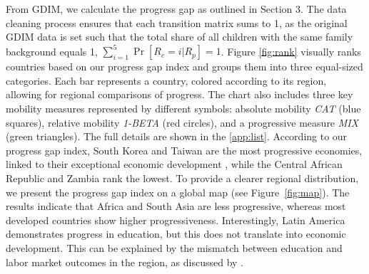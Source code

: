 
From GDIM, we calculate the progress gap as outlined in Section 3. The data cleaning process ensures that each transition matrix sums to 1, as the original GDIM data is set such that the total share of all children with the same family background equals 1, \(\sum_{i=1}^{5} \operatorname{Pr}[R_c = i| R_p] = 1\). Figure \ref{fig:rank} visually ranks countries based on our progress gap index and groups them into three equal-sized categories. Each bar represents a country, colored according to its region, allowing for regional comparisons of progress. The chart also includes three key mobility measures represented by different symbols: absolute mobility \textit{CAT} (blue squares), relative mobility \textit{1-BETA} (red circles), and a progressive measure \textit{MIX} (green triangles). The full details are shown in the  \ref{app:list}. According to our progress gap index, South Korea and Taiwan are the most progressive economies, linked to their exceptional economic development \citep{morris1996asia}, while the Central African Republic and Zambia rank the lowest. To provide a clearer regional distribution, we present the progress gap index on a global map (see Figure~\ref{fig:map}). The results indicate that Africa and South Asia are less progressive, whereas most developed countries show higher progressiveness. Interestingly, Latin America demonstrates progress in education, but this does not translate into economic development. This can be explained by the mismatch between education and labor market outcomes in the region, as discussed by \citet{bassi2012disconnected}.

